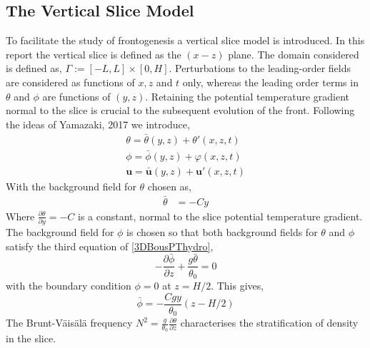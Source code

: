 \subsection{The Vertical Slice Model}
To facilitate the study of frontogenesis a vertical slice model is introduced. In this report the vertical slice is defined as the $\left(x-z\right)$ plane. The domain considered is defined as, $\Gamma := [-L,L] \times [0,H]$. Perturbations to the leading-order fields are considered as functions of $x,z$ and $t$ only, whereas the leading order terms in $\theta$ and $\phi$ are functions of $\left(y,z\right)$. Retaining the potential temperature gradient normal to the slice is crucial to the subsequent evolution of the front. Following the ideas of Yamazaki, 2017 \cite{Yamazaki2017} we introduce,
\begin{equation}
	\begin{aligned}
		\theta = \bar{\theta}(y,z) + \theta'(x,z,t)\\ 
		\phi = \bar{\phi}(y,z) + \varphi(x,z,t)\\
		\bm{u} = \bar{\bm{u}}(y,z) + \bm{u}'(x,z,t)
	\end{aligned}
\label{perturbations for vertical slice}
\end{equation}
With the background field for $\theta$ chosen as,
\begin{equation}
	\begin{aligned}
		\bar{\theta} &= -Cy
	\end{aligned}
\label{bgTP}
\end{equation}
Where $\frac{\partial \theta}{\partial y} = -C$ is a constant, normal to the slice potential temperature gradient.\\
\linebreak
The background field for $\phi$ is chosen so that both background fields for $\theta $ and $\phi $ satisfy the third equation of \ref{3DBousPThydro},
\begin{equation*}
	-\frac{\partial \bar{\phi}}{\partial z} + \frac{g\bar{\theta}}{\theta_0} = 0
\end{equation*}
with the boundary condition $\phi = 0$ at $z = H/2$. This gives,
\begin{equation}
	\bar{\phi} = -\frac{Cgy}{\theta_0}\left(z - H/2\right)
\label{bgphi}
\end{equation}
The Brunt-V\"{a}is\"{a}l\"{a} frequency $N^2 = \frac{g}{\theta_0}\frac{\partial \theta}{\partial z}$ characterises the stratification of density in the slice.\\
